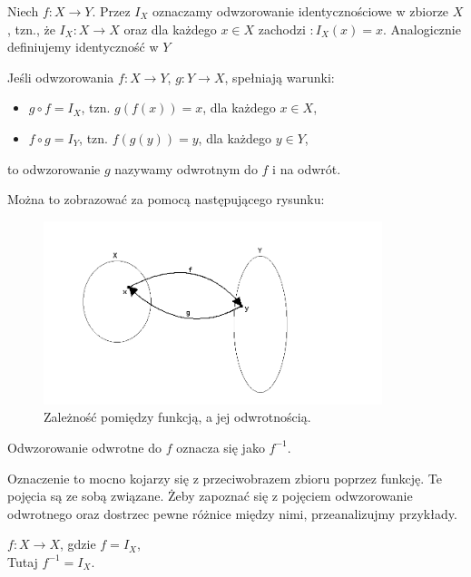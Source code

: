 \begin{ozn}
Niech $f: X \rightarrow Y$. Przez $I_X$ oznaczamy odwzorowanie identycznościowe w zbiorze $X$, tzn., że $I_X: X \rightarrow X$ oraz dla każdego $x\in X$ zachodzi $ : I_X(x)=x $. Analogicznie definiujemy identyczność w $Y$
\end{ozn}

\begin{definicja}
Jeśli odwzorowania $f: X \rightarrow Y $,  $g: Y \rightarrow X $, spełniają warunki:
\begin{itemize}
\item $ g \circ f = I_X  $, tzn. $g(f(x))=x $, dla każdego $x \in X$, \label{zlozenieWarunek1}
\item $ f \circ g = I_Y  $, tzn. $f(g(y))=y $, dla każdego $y \in Y$,
\end{itemize}
to odwzorowanie $g$ nazywamy odwrotnym do $f$ i na odwrót.
\end{definicja}

Można to zobrazować za pomocą następującego rysunku:


\begin{figure}[H]%
  \begin{center}
    \includegraphics[width=0.88\textwidth]{./podrozdzial01-obrazki/3.png}
  \end{center}
  \caption{Zależność pomiędzy funkcją, a jej odwrotnością.}
\end{figure}

\begin{ozn}
Odwzorowanie odwrotne do $f$ oznacza się jako $f^{-1}$.
\end{ozn}
Oznaczenie to mocno kojarzy się z przeciwobrazem zbioru poprzez funkcję. Te pojęcia są ze sobą związane. Żeby zapoznać się z pojęciem odwzorowanie odwrotnego oraz dostrzec pewne różnice między nimi, przeanalizujmy przykłady.

\begin{przyklad}
$f: X \rightarrow X$, gdzie $f = I_X$,
\\ Tutaj $f^{-1}=I_X$.
\end{przyklad}

